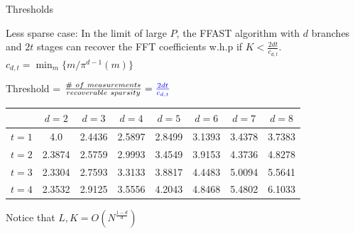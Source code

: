 \documentclass[10pt,xcolor=table]{beamer}
\begin{document}
	\begin{frame}{Thresholds}
		
		\begin{theorem}\label{thm:thresh}
			Less sparse case: In the limit of large $P$, the FFAST algorithm with $d$ branches and $2t$ stages can recover the FFT coefficients w.h.p if $K < \frac{2dt}{c_{d,t}}$. \\
			\vspace{2mm}
			\centering
			\color{blue} $c_{d,t} = \min_m \{ m / \pi^{d-1}(m)\} $
		\end{theorem}
		
		\begin{block}{}
			
			\begin{center}
				\alert{Threshold} = $ \frac{\# \ of \ measurements}{recoverable \ sparsity}={\color{blue} \frac{2dt}{c_{d,t}}}$
			\end{center}
			
			\vspace{-6mm}
			\color{black}
			\begin{table}[ht]
				\centering
				\begin{tabular}{c|ccccccc}
					\hline
					& $d=2$ & $d=3$ & $d=4$ & $d=5$ & $d=6$ & $d=7$ & $d=8$ \\
					\hline
					\rowcolor{lightgray}
					$t=1$& 4.0  & 2.4436 & 2.5897 & 2.8499 & 3.1393 & 3.4378 & 3.7383 \\
					$t=2$& 2.3874 & 2.5759 & 2.9993 & 3.4549 & 3.9153 & 4.3736 & 4.8278 \\
					\rowcolor{lightgray}
					$t=3$& 2.3304 & 2.7593 & 3.3133 & 3.8817 & 4.4483 & 5.0094 & 5.5641 \\
					$t=4$& 2.3532 & 2.9125 & 3.5556& 4.2043 & 4.8468 & 5.4802 & 6.1033 \\
					
					\hline
				\end{tabular}
			\end{table}
			\vspace{-3mm}
			
			Notice that $L,K = O \left( N^{\frac{1-d}{d}}\right)$
		\end{block}
		
		
	\end{frame}
\end{document}
